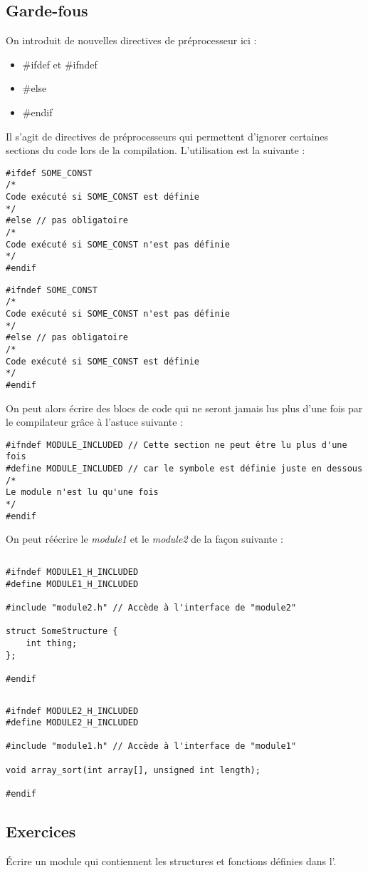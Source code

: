 \documentclass[../../../main.tex]{subfiles}
\begin{document}
\subsection{Garde-fous}
\label{sub:garde_fous}
On introduit de nouvelles directives de préprocesseur ici : 
\begin{itemize}
	\item \textsf{\#ifdef} et \textsf{\#ifndef}
	\item \textsf{\#else}
	\item \textsf{\#endif}
\end{itemize}
Il s'agit de directives de préprocesseurs qui permettent d'ignorer certaines sections du code lors de la compilation. L'utilisation est la suivante :

\begin{minipage}{0.5\textwidth}
	\begin{verbatim}
#ifdef SOME_CONST
/*
Code exécuté si SOME_CONST est définie
*/
#else // pas obligatoire
/*
Code exécuté si SOME_CONST n'est pas définie
*/
#endif
\end{verbatim}
\end{minipage}
\begin{minipage}{0.5\textwidth}
\begin{verbatim}
#ifndef SOME_CONST
/*
Code exécuté si SOME_CONST n'est pas définie
*/
#else // pas obligatoire
/*
Code exécuté si SOME_CONST est définie
*/
#endif
\end{verbatim}
\end{minipage}

On peut alors écrire des blocs de code qui ne seront jamais lus plus d'une fois par le compilateur grâce à l'astuce suivante :
\begin{verbatim}
#ifndef MODULE_INCLUDED // Cette section ne peut être lu plus d'une fois
#define MODULE_INCLUDED // car le symbole est définie juste en dessous
/*
Le module n'est lu qu'une fois
*/
#endif
\end{verbatim}
On peut réécrire le \textit{module1} et le \textit{module2} de la façon suivante :
\begin{lstlisting}[title=module1.h]
\end{lstlisting}
\begin{verbatim}
#ifndef MODULE1_H_INCLUDED
#define MODULE1_H_INCLUDED

#include "module2.h" // Accède à l'interface de "module2"

struct SomeStructure {
	int thing;
};

#endif
\end{verbatim}
\begin{lstlisting}[title=module2.h]
\end{lstlisting}
\begin{verbatim}
#ifndef MODULE2_H_INCLUDED
#define MODULE2_H_INCLUDED

#include "module1.h" // Accède à l'interface de "module1"

void array_sort(int array[], unsigned int length);

#endif
\end{verbatim}
\subsection{Exercices}
 Écrire un module qui contiennent les structures et fonctions définies dans l'.
\end{document}
